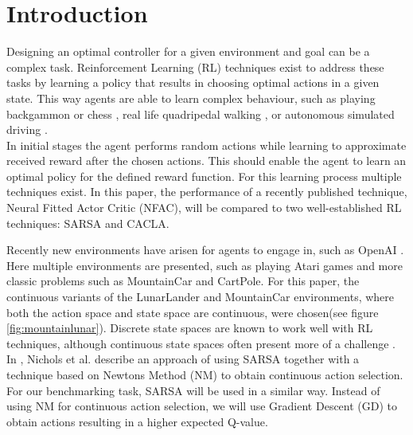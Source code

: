 
\section{Introduction}

Designing an optimal controller for a given environment and goal can be a complex task. Reinforcement Learning (RL) techniques exist to address these tasks by learning a policy that results in choosing optimal actions in a given state. This way agents are able to learn complex behaviour, such as playing backgammon \cite{tesauro2002programming} or chess \cite{baxter1999knightcap},
real life quadripedal walking \cite{kohl2004policy}, or autonomous simulated driving \cite{}. \\  %


In initial stages the agent performs random actions while learning to approximate received reward after the chosen actions. This should enable the agent to learn an optimal policy for the defined reward function. For this learning process multiple techniques exist. In this paper, the performance of a recently published technique, Neural Fitted Actor Critic (NFAC), will be compared to two well-established RL techniques: SARSA and CACLA.   

Recently new environments have arisen for agents to engage in, such as OpenAI \cite{openaigym}. Here multiple environments are presented, such as playing Atari games and more classic problems such as MountainCar and CartPole. For this paper, the continuous variants of the LunarLander and MountainCar environments, where both the action space and state space are continuous, were chosen(see figure \ref{fig:mountainlunar}). Discrete state spaces are known to work well with RL techniques, although continuous state spaces often present more of a challenge \cite{TODO}. \\

In \cite{nichols2015continuous}, Nichols et al. describe an approach of using SARSA together with a technique based on Newtons Method (NM) to obtain continuous action selection. For our benchmarking task, SARSA will be used in a similar way. Instead of using NM for continuous action selection, we will use Gradient Descent (GD) to obtain actions resulting in a higher expected Q-value.

